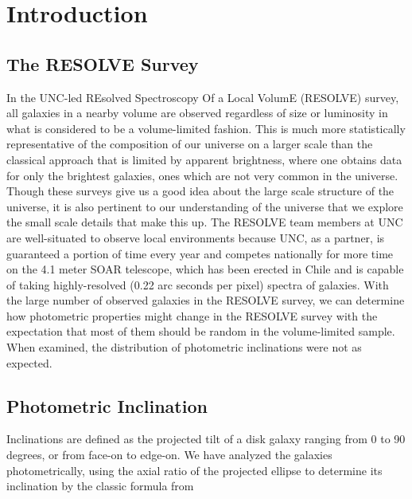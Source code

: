 \documentclass{emulateapj}
\begin{document}

\section{Introduction}
\subsection{The RESOLVE Survey}
In the UNC-led REsolved Spectroscopy Of a Local VolumE (RESOLVE) survey, all galaxies in a nearby volume are observed regardless of size or luminosity in what is considered to be a volume-limited fashion. This is much more statistically representative of the composition of our universe on a larger scale than the classical approach that is limited by apparent brightness, where one obtains data for only the brightest galaxies, ones which are not very common in the universe. Though these surveys give us a good idea about the large scale structure of the universe, it is also pertinent to our understanding of the universe that we explore the small scale details that make this up. The RESOLVE team members at UNC are well-situated to observe local environments because UNC, as a partner, is guaranteed a portion of time every year and competes nationally for more time on the 4.1 meter SOAR telescope, which has been erected in Chile and is capable of taking highly-resolved (0.22 arc seconds per pixel) spectra of galaxies. With the large number of observed galaxies in the RESOLVE survey, we can determine how photometric properties might change in the RESOLVE survey with the expectation that most of them should be random in the volume-limited sample. When examined, the distribution of photometric inclinations were not as expected.

\subsection{Photometric Inclination}

Inclinations are defined as the projected tilt of a disk galaxy ranging from 0 to 90 degrees, or from face-on to edge-on. We have analyzed the galaxies photometrically, using the axial ratio of the projected ellipse to determine its inclination by the classic formula from \citet{hubble}
\end{document}
